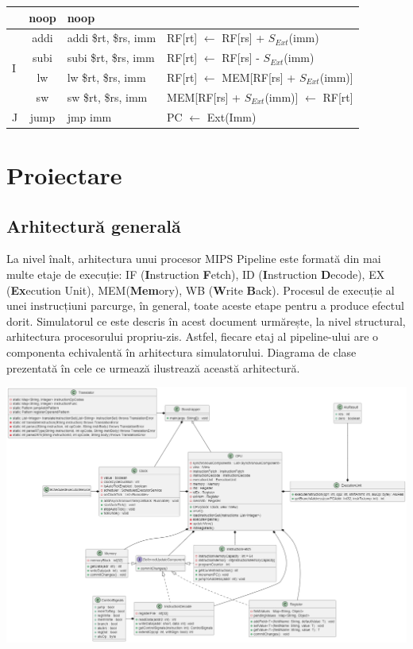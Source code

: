 \documentclass{article}
\begin{document}
\begin{tcolorbox}[colback=white!5!white,colframe=violet!75!black,title=Instrucțiuni suportate]
\begin{tabularx}{\linewidth}{|c|c|X|X|}
 & noop & noop &  \\ \hline
\multicolumn{1}{|l|}{\multirow{4}{*}{I}} & addi & addi \$rt, \$rs, imm & RF{[}rt{]} $\leftarrow$ RF{[}rs{]} + $S_{Ext}$(imm)  \\ \cline{2-4} 
\multicolumn{1}{|l|}{} & subi & subi \$rt, \$rs, imm & RF{[}rt{]} $\leftarrow$ RF{[}rs{]} - $S_{Ext}$(imm)  \\ \cline{2-4} 
\multicolumn{1}{|l|}{} & lw & lw \$rt, \$rs, imm & RF{[}rt{]} $\leftarrow$ MEM[RF{[}rs{]} + $S_{Ext}$(imm)] \\ \cline{2-4} 
\multicolumn{1}{|l|}{} & sw & sw \$rt, \$rs, imm & MEM[RF{[}rs{]} + $S_{Ext}$(imm)] $\leftarrow$ RF{[}rt{]} \\ \hline
\multicolumn{1}{|l|}{J} & jump & jmp imm &  PC $\leftarrow$ Ext(Imm)\\ \hline
\end{tabularx}
\end{tcolorbox}

\newpage
\section{Proiectare}
\subsection{Arhitectură generală}
La nivel înalt, arhitectura unui procesor MIPS Pipeline este formată din mai multe etaje de execuție: IF (\textbf{I}nstruction \textbf{F}etch), ID (\textbf{I}nstruction \textbf{D}ecode), EX (\textbf{Ex}ecution Unit), MEM(\textbf{Mem}ory), WB (\textbf{W}rite \textbf{B}ack). Procesul de execuție al unei instrucțiuni parcurge, în general, toate aceste etape pentru a produce efectul dorit. Simulatorul ce este descris în acest document urmărește, la nivel structural, arhitectura procesorului propriu-zis. Astfel, fiecare etaj al pipeline-ului are o componenta echivalentă în arhitectura simulatorului. Diagrama de clase prezentată în cele ce urmează ilustrează această arhitectură.

\begin{tcolorbox}[colback=white!5!white,colframe=violet!75!black,title=Diagrama de clase]
\includegraphics[width=\linewidth]{img/classDiagram.png}
\end{tcolorbox}
\end{document}
